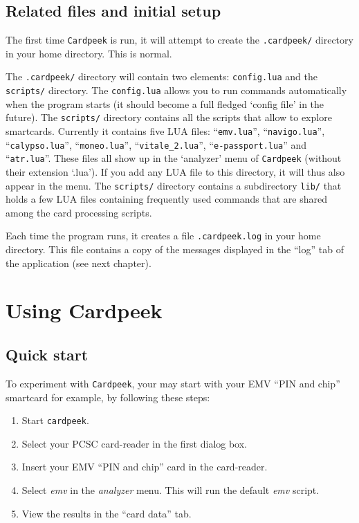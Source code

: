 \documentclass[11pt]{report}
\begin{document}
\section{Related files and initial setup}
The first time \texttt{Cardpeek} is run, it will attempt to create the
\texttt{.cardpeek/} directory in your home directory. This is normal.

The \texttt{.cardpeek/} directory will contain two elements: \texttt{config.lua} and the \texttt{scripts/} directory.
The \texttt{config.lua} allows you to run commands automatically when the program starts 
(it should become a full fledged `config file' in the future).
The \texttt{scripts/} directory contains all the scripts that allow to explore smartcards. 
Currently it contains five LUA files: ``\texttt{emv.lua}'', ``\texttt{navigo.lua}'', ``\texttt{calypso.lua}'', 
``\texttt{moneo.lua}'', ``\texttt{vitale\_2.lua}'', ``\texttt{e-passport.lua}'' and ``\texttt{atr.lua}''.
These files all show up in the `analyzer' menu of \texttt{Cardpeek} (without their extension `.lua').
If you add any LUA file to this directory, it will thus also appear in the menu.
The \texttt{scripts/} directory contains a subdirectory \texttt{lib/} that holds a few LUA files containing 
frequently used commands that are shared among the card processing scripts.

Each time the program runs, it creates a file \texttt{.cardpeek.log} in your home directory.
This file contains a copy of the messages displayed in the ``log'' tab of the application (see next chapter). 

\chapter{Using Cardpeek}

\section{Quick start}

To experiment with \texttt{Cardpeek}, your may start with your EMV ``PIN and chip'' smartcard for example, 
by following these steps:
\begin{enumerate}
\item{Start \texttt{cardpeek}.}
\item{Select your PCSC card-reader in the first dialog box.}
\item{Insert your EMV ``PIN and chip'' card in the card-reader.}
\item{Select \emph{emv} in the \emph{analyzer} menu. This will run the default \emph{emv} script.}
\item{View the results in the ``card data'' tab.}
\end{enumerate}
\end{document}

